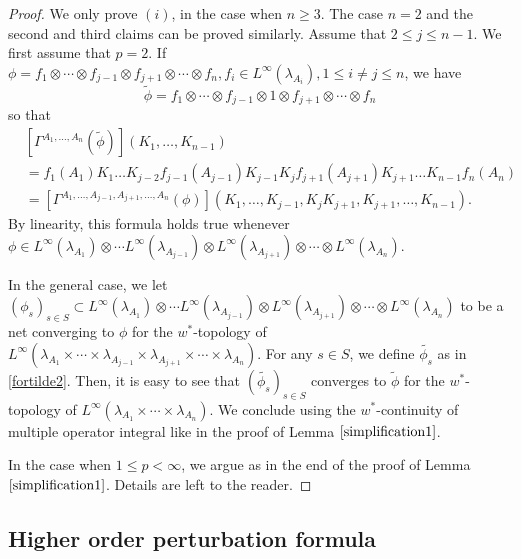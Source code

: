 \documentclass[12pt]{amsart}
\theoremstyle{remark}
\begin{document}
\begin{proof}
We only prove $(i)$, in the case when $n\geq 3$. The case $n=2$ and the second and third claims can be proved similarly. Assume that $2\leq j \leq n-1$. We first assume that $p=2$. If $\phi = f_1 \otimes \cdots \otimes f_{j-1} \otimes f_{j+1} \otimes \cdots \otimes f_n, f_i \in L^{\infty}(\lambda_{A_i}), 1\leq i\neq j \leq n$, we have
\begin{equation*}
\widetilde{\phi} = f_1 \otimes \cdots \otimes f_{j-1} \otimes 1 \otimes f_{j+1} \otimes \cdots \otimes f_n
\end{equation*}
so that
\begin{align*}
& \left[ \Gamma^{A_1, \ldots, A_n}(\widetilde{\phi})\right] (K_1, \ldots, K_{n-1}) \\
&  = f_1(A_1)K_1 \ldots K_{j-2}f_{j-1}(A_{j-1}) K_{j-1} K_j f_{j+1}(A_{j+1}) K_{j+1} \ldots K_{n-1}f_n(A_n) \\
& = \left[ \Gamma^{A_1, \ldots, A_{j-1}, A_{j+1}, \ldots, A_n}(\phi)\right] \left(K_1, \ldots, K_{j-1}, K_j K_{j+1}, K_{j+1}, \ldots, K_{n-1}\right).
\end{align*}
By linearity, this formula holds true whenever $\phi \in L^{\infty}(\lambda_{A_1}) \otimes \cdots L^{\infty}(\lambda_{A_{j-1}}) \otimes L^{\infty}(\lambda_{A_{j+1}}) \otimes \cdots \otimes L^{\infty}(\lambda_{A_n})$.

In the general case, we let $(\phi_s)_{s\in S} \subset L^{\infty}(\lambda_{A_1}) \otimes \cdots L^{\infty}(\lambda_{A_{j-1}}) \otimes L^{\infty}(\lambda_{A_{j+1}}) \otimes \cdots \otimes L^{\infty}(\lambda_{A_n})$ to be a net converging to $\phi$ for the $w^*$-topology of $L^{\infty}(\lambda_{A_1} \times \cdots \times \lambda_{A_{j-1}} \times \lambda_{A_{j+1}} \times \cdots \times \lambda_{A_n})$. For any $s\in S$, we define $\widetilde{\phi_s}$ as in \eqref{fortilde2}. Then, it is easy to see that $(\widetilde{\phi_s})_{s\in S}$ converges to $\widetilde{\phi}$ for the $w^*$-topology of $L^{\infty}(\lambda_{A_1} \times \cdots \times \lambda_{A_n})$. We conclude using the $w^*$-continuity of multiple operator integral like in the proof of Lemma $\ref{simplification1}$.

In the case when $1\leq p < \infty$, we argue as in the end of the proof of Lemma $\ref{simplification1}$. Details are left to the reader.

\end{proof}




\subsection{Higher order perturbation formula}\label{HOPF}
\end{document}
